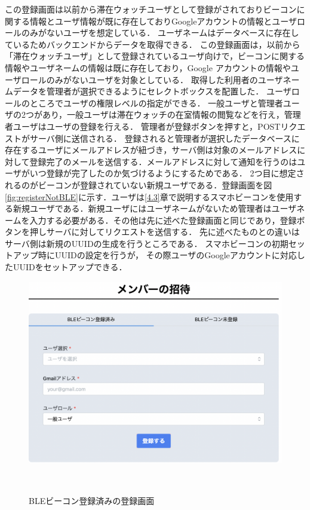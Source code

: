 この登録画面は以前から滞在ウォッチユーザとして登録がされておりビーコンに関する情報とユーザ情報が既に存在しておりGoogleアカウントの情報とユーザロールのみがないユーザを想定している．
ユーザネームはデータベースに存在しているためバックエンドからデータを取得できる．
この登録画面は，以前から「滞在ウォッチユーザ」として登録されているユーザ向けで，ビーコンに関する情報やユーザネームの情報は既に存在しており，Google アカウントの情報やユーザロールのみがないユーザを対象としている．
取得した利用者のユーザネームデータを管理者が選択できるようにセレクトボックスを配置した．
ユーザロールのところでユーザの権限レベルの指定ができる．
一般ユーザと管理者ユーザの2つがあり，一般ユーザは滞在ウォッチの在室情報の閲覧などを行え，管理者ユーザはユーザの登録を行える．
管理者が登録ボタンを押すと，POSTリクエストがサーバ側に送信される．
登録されると管理者が選択したデータベースに存在するユーザにメールアドレスが紐づき，サーバ側は対象のメールアドレスに対して登録完了のメールを送信する．メールアドレスに対して通知を行うのはユーザがいつ登録が完了したのか気づけるようにするためである．
2つ目に想定されるのがビーコンが登録されていない新規ユーザである．登録画面を図\ref{fig:registerNotBLE}に示す．ユーザは\ref{4.3}章で説明するスマホビーコンを使用する新規ユーザである．新規ユーザにはユーザネームがないため管理者はユーザネームを入力する必要がある．その他は先に述べた登録画面と同じであり，登録ボタンを押しサーバに対してリクエストを送信する．
先に述べたものとの違いはサーバ側は新規のUUIDの生成を行うところである．
スマホビーコンの初期セットアップ時にUUIDの設定を行うが，
その際ユーザのGoogleアカウントに対応したUUIDをセットアップできる．


\begin{figure}[tbh]
  \centering
  \includegraphics[width=16cm]{image/registerBLE.png}
  \caption{BLEビーコン登録済みの登録画面}　\label{fig:registerBLE}

\end{figure}

